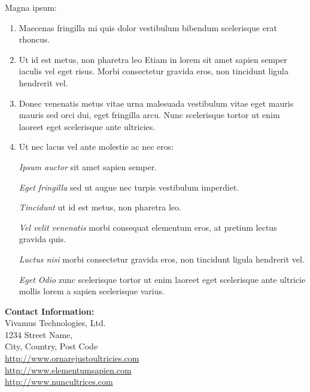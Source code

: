\documentclass[10pt]{article}\usepackage[]{graphicx}\usepackage[]{color}
\begin{document}
\begin{minipage}[t]{.30\linewidth} %


\begin{mdframed}[style=sidebar,frametitle={}] %


Magna ipsum:

\begin{enumerate}
\item Maecenas fringilla mi quis dolor vestibulum bibendum scelerisque erat rhoncus.
\item Ut id est metus, non pharetra leo Etiam in lorem sit amet sapien semper iaculis vel eget risus. Morbi consectetur gravida eros, non tincidunt ligula hendrerit vel.
\item Donec venenatis metus vitae urna malesuada vestibulum vitae eget mauris mauris sed orci dui, eget fringilla arcu. Nunc scelerisque tortor ut enim laoreet eget scelerisque ante ultricies.
\item Ut nec lacus vel ante molestie ac nec eros:

\textsl{Ipsum auctor} sit amet sapien semper.

\textsl{Eget fringilla} sed ut augue nec turpis vestibulum imperdiet.

\textsl{Tincidunt} ut id est metus, non pharetra leo.

\textsl{Vel velit venenatis } morbi consequat elementum eros, at pretium lectus gravida quis.

\textsl{Luctus nisi} morbi consectetur gravida eros, non tincidunt ligula hendrerit vel.

\textsl{Eget Odio} zunc scelerisque tortor ut enim laoreet eget scelerisque ante ultricie mollis lorem a sapien scelerisque varius.
\end{enumerate}

\BackToContents %

\end{mdframed}\hfill


\centering
\begin{minipage}[t]{.95\linewidth}
\textbf{Contact Information:}\\
Vivamus Technologies, Ltd.\\
1234 Street Name,\\
City, Country, Post Code\\
\href{http://www.example.com}{http://www.ornarejustoultricies.com}\\
\href{http://www.example.com}{http://www.elementumsapien.com}\\
\href{http://www.example.com}{http://www.nuncultrices.com} 
\end{minipage}


\end{minipage}
\end{document}
